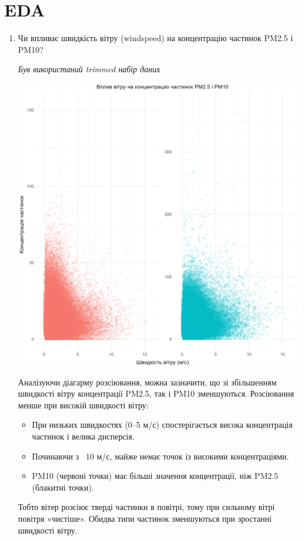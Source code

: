 \documentclass{article}
\begin{document}
\begin{enumerate}
    
\end{enumerate}

\pagebreak

\section{EDA}

\begin{enumerate}
    \item Чи впливає швидкість вітру (windspeed) на концентрацію частинок PM2.5 і PM10?
    
    \quad \textit{Був використаний trimmed набір даних}

    \includegraphics[width=6in]{question1/wind_speed_vs_pm.png}

    Аналізуючи діагарму розсіювання, можна зазначити, що зі збільшенням швидкості вітру концентрації PM2.5, так і PM10 зменшуються.
    Розсіювання менше при високій швидкості вітру:
    \begin{itemize}
        \item При низьких швидкостях (0–5 м/с) спостерігається висока концентрація частинок і велика дисперсія.
        \item Починаючи з ~10 м/с, майже немає точок із високими концентраціями.
        \item PM10 (червоні точки) має більші значення концентрації, ніж PM2.5 (блакитні точки).
    \end{itemize}
    Тобто вітер розсіює тверді частинки в повітрі, тому при сильному вітрі повітря «чистіше». Обидва типи частинок зменшуються при зростанні швидкості вітру.


\end{enumerate}
\end{document}
